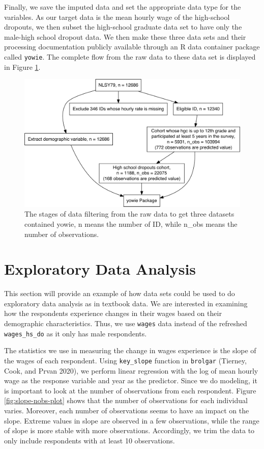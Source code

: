 \documentclass[12pt]{article}
\begin{document}
Finally, we save the imputed data and set the appropriate data type for the variables. As our target data is the mean hourly wage of the high-school dropouts, we then subset the high-school graduate data set to have only the male-high school dropout data. We then make these three data sets and their processing documentation publicly available through an R data container package called \texttt{yowie}. The complete flow from the raw data to these data set is displayed in Figure \ref{fig:flow-chart}.

\begin{figure}

{\centering \includegraphics[width=468px]{figures/flow-chart-1} 

}

\caption{The stages of data filtering from the raw data to get three datasets contained yowie, n means the number of ID, while n\_obs means the number of observations.}\label{fig:flow-chart}
\end{figure}

\hypertarget{eda}{%
\section{Exploratory Data Analysis}\label{eda}}

This section will provide an example of how data sets could be used to do exploratory data analysis as in textbook data. We are interested in examining how the respondents experience changes in their wages based on their demographic characteristics. Thus, we use \texttt{wages} data instead of the refreshed \texttt{wages\_hs\_do} as it only has male respondents.

The statistics we use in measuring the change in wages experience is the slope of the wages of each respondent.
Using \texttt{key\_slope} function in \texttt{brolgar} (Tierney, Cook, and Prvan 2020), we perform linear regression with the log of mean hourly wage as the response variable and year as the predictor. Since we do modeling, it is important to look at the number of observations from each respondent. Figure \ref{fig:slope-nobs-plot} shows that the number of observations for each individual varies. Moreover, each number of observations seems to have an impact on the slope. Extreme values in slope are observed in a few observations, while the range of slope is more stable with more observations. Accordingly, we trim the data to only include respondents with at least 10 observations.
\end{document}
